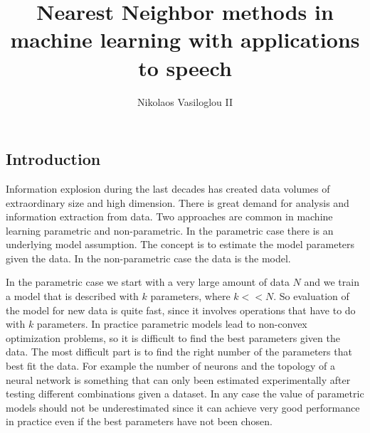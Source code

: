 \documentclass[12pt,letterpaper,doublespaced,ETD,dvips,proposal]{gtthesis}
\title{Nearest Neighbor methods in machine learning with applications to speech}
\author{Nikolaos Vasiloglou II}
\begin{document}
\pagestyle{plain}

\begin{FrontMatter}
\contents %
\end{FrontMatter}

\begin{Body}
\section{Introduction}
\label{intro} Information explosion during the last decades has
created data volumes of extraordinary size and high dimension. There
is great demand for analysis and information extraction from data.
Two approaches are common in machine learning parametric and
non-parametric. In the parametric case there is an underlying model
assumption. The concept is to estimate the model parameters given
the data. In the non-parametric case the data is the model.

In the parametric case we start with a very large amount of data $N$
and we train a model that is described with $k$ parameters, where
$k<<N$. So evaluation of the model for new data is quite fast, since
it involves operations that have to do with $k$ parameters. In
practice parametric models lead to non-convex optimization problems,
so it is difficult to find the best parameters given the data. The
most difficult part is to find the right number of the parameters
that best fit the data. For example the number of neurons and the
topology of a neural network is something that can only been
estimated experimentally after testing different combinations given
a dataset. In any case the value of parametric models should not be
underestimated since it can achieve very good performance in
practice even if the best parameters have not been chosen.


\end{Body}
\end{document}

